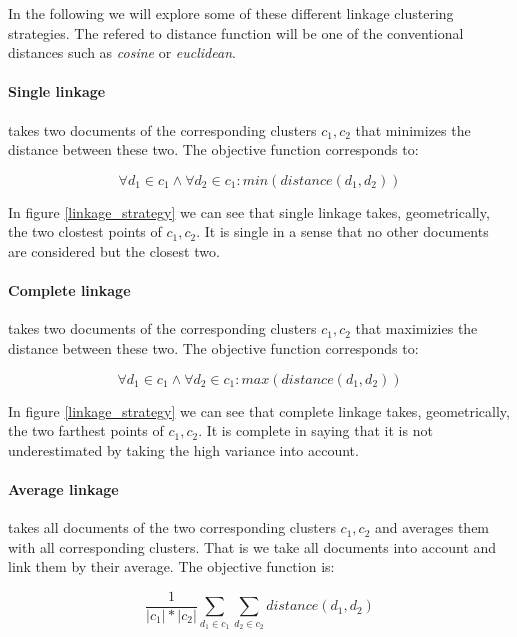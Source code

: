     In the following we will explore some of these different linkage clustering strategies.
    The refered to distance function will be one of the conventional distances such as \emph{cosine} or \emph{euclidean}.

    \paragraph{Single linkage} takes two documents of the corresponding clusters $c_1,c_2$ that minimizes the distance between these two. The objective function corresponds to:
      
      \begin{equation}
        \forall d_1 \in c_1 \wedge \forall d_2 \in c_1: min(distance(d_1, d_2))
      \end{equation}

    In figure \ref{linkage_strategy} we can see that single linkage takes, geometrically, the two clostest points of $c_1,c_2$. It is single in a sense that no other documents are considered but the closest two.

    \paragraph{Complete linkage} takes two documents of the corresponding clusters $c_1,c_2$ that maximizies the distance between these two. The objective function corresponds to:
      
      \begin{equation}
        \forall d_1 \in c_1 \wedge \forall d_2 \in c_1: max(distance(d_1, d_2))
      \end{equation}

    In figure \ref{linkage_strategy} we can see that complete linkage takes, geometrically, the two farthest points of $c_1,c_2$. It is complete in saying that it is not underestimated by taking the high variance into account.

    \paragraph{Average linkage} takes all documents of the two corresponding clusters $c_1,c_2$ and averages them with all corresponding clusters. That is we take all documents into account and link them by their average. The objective function is:

      \begin{equation}
        \frac{1}{|c_1|*|c_2|} \sum_{d_1 \in c_1} \sum_{d_2 \in c_2} distance(d_1, d_2)
      \end{equation}

